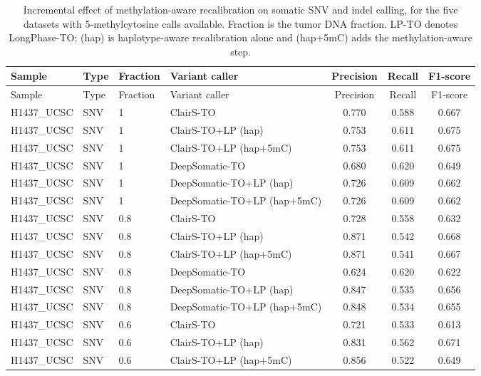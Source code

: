 \documentclass[pdflatex,sn-nature]{sn-jnl}
\begin{document}
\FloatBarrier
{\footnotesize
\begin{longtable}{@{}llllccc@{}}
  \caption[Incremental effect of methylation-aware recalibration]%
  {Incremental effect of methylation-aware recalibration on somatic SNV and indel
  calling, for the five datasets with 5-methylcytosine calls available. Fraction is the
  tumor DNA fraction. LP-TO denotes LongPhase-TO; (hap) is haplotype-aware
  recalibration alone and (hap+5mC) adds the methylation-aware step.}
  \label{tab:methylation_recalibration}\\
  \toprule
  Sample & Type & Fraction & Variant caller & Precision & Recall & F1-score \\
  \midrule
  \endfirsthead
  \toprule
  Sample & Type & Fraction & Variant caller & Precision & Recall & F1-score \\
  \midrule
  \endhead
  \bottomrule
  \endlastfoot
  H1437\_UCSC & SNV & 1 & ClairS-TO & 0.770 & 0.588 & 0.667 \\
  H1437\_UCSC & SNV & 1 & ClairS-TO+LP (hap) & 0.753 & 0.611 & 0.675 \\
  H1437\_UCSC & SNV & 1 & ClairS-TO+LP (hap+5mC) & 0.753 & 0.611 & 0.675 \\
  H1437\_UCSC & SNV & 1 & DeepSomatic-TO & 0.680 & 0.620 & 0.649 \\
  H1437\_UCSC & SNV & 1 & DeepSomatic-TO+LP (hap) & 0.726 & 0.609 & 0.662 \\
  H1437\_UCSC & SNV & 1 & DeepSomatic-TO+LP (hap+5mC) & 0.726 & 0.609 & 0.662 \\
  H1437\_UCSC & SNV & 0.8 & ClairS-TO & 0.728 & 0.558 & 0.632 \\
  H1437\_UCSC & SNV & 0.8 & ClairS-TO+LP (hap) & 0.871 & 0.542 & 0.668 \\
  H1437\_UCSC & SNV & 0.8 & ClairS-TO+LP (hap+5mC) & 0.871 & 0.541 & 0.667 \\
  H1437\_UCSC & SNV & 0.8 & DeepSomatic-TO & 0.624 & 0.620 & 0.622 \\
  H1437\_UCSC & SNV & 0.8 & DeepSomatic-TO+LP (hap) & 0.847 & 0.535 & 0.656 \\
  H1437\_UCSC & SNV & 0.8 & DeepSomatic-TO+LP (hap+5mC) & 0.848 & 0.534 & 0.655 \\
  H1437\_UCSC & SNV & 0.6 & ClairS-TO & 0.721 & 0.533 & 0.613 \\
  H1437\_UCSC & SNV & 0.6 & ClairS-TO+LP (hap) & 0.831 & 0.562 & 0.671 \\
  H1437\_UCSC & SNV & 0.6 & ClairS-TO+LP (hap+5mC) & 0.856 & 0.522 & 0.649 \\

\end{longtable}}
\end{document}
